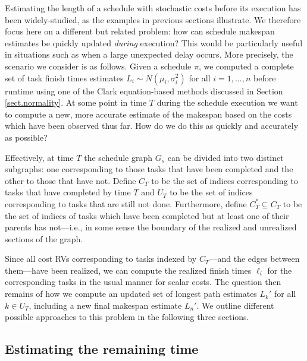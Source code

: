 \documentclass[12pt]{article}
\begin{document}
Estimating the length of a schedule with stochastic costs before its execution has been widely-studied, as the examples in previous sections illustrate. We therefore focus here on a different but related problem: how can schedule makespan estimates be quickly updated {\em during} execution? This would be particularly useful in situations such as when a large unexpected delay occurs. More precisely, the scenario we consider is as follows. Given a schedule $\pi$, we computed a complete set of task finish times estimates $L_i \sim N(\mu_i, \sigma_i^2)$ for all $i = 1, \dots, n$ before runtime using one of the Clark equation-based methods discussed in Section \ref{sect.normality}. At some point in time $T$ during the schedule execution we want to compute a new, more accurate estimate of the makespan based on the costs which have been observed thus far. How do we do this as quickly and accurately as possible?

Effectively, at time $T$ the schedule graph $G_s$ can be divided into two distinct subgraphs: one corresponding to those tasks that have been completed and the other to those that have not. Define $C_T$ to be the set of indices corresponding to tasks that have completed by time $T$ and $U_T$ to be the set of indices corresponding to tasks that are still not done. Furthermore, define $C_T^* \subseteq C_T$ to be the set of indices of tasks which have been completed but at least one of their parents has not---i.e., in some sense the boundary of the realized and unrealized sections of the graph.

Since all cost RVs corresponding to tasks indexed by $C_T$---and the edges between them---have been realized, we can compute the realized finish times $\ell_i$ for the corresponding tasks in the usual manner for scalar costs. The question then remains of how we compute an updated set of longest path estimates $L_k'$ for all $k \in U_T$, including a new final makespan estimate $L_n'$. We outline different possible approaches to this problem in the following three sections.

\subsection{Estimating the remaining time}
\label{subsect.remaining}
\end{document}

